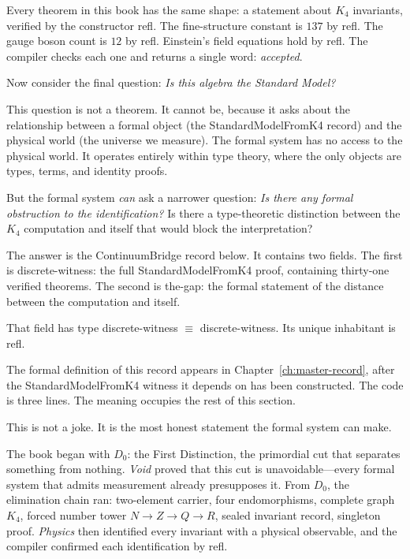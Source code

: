 \documentclass[11pt,a4paper]{book}
\def\mathbb#1{#1}%
\def\texttt#1{#1}%
\begin{document}
Every theorem in this book has the same shape: a statement about $K_4$ invariants, verified by the constructor \texttt{refl}. The fine-structure constant is $137$ by \texttt{refl}. The gauge boson count is $12$ by \texttt{refl}. Einstein's field equations hold by \texttt{refl}. The compiler checks each one and returns a single word: \emph{accepted}.

Now consider the final question: \emph{Is this algebra the Standard Model?}

This question is not a theorem. It cannot be, because it asks about the relationship between a formal object (the \texttt{StandardModelFromK4} record) and the physical world (the universe we measure). The formal system has no access to the physical world. It operates entirely within type theory, where the only objects are types, terms, and identity proofs.

But the formal system \emph{can} ask a narrower question: \emph{Is there any formal obstruction to the identification?} Is there a type-theoretic distinction between the $K_4$ computation and itself that would block the interpretation?

The answer is the \texttt{ContinuumBridge} record below. It contains two fields. The first is \texttt{discrete-witness}: the full \texttt{StandardModelFromK4} proof, containing thirty-one verified theorems. The second is \texttt{the-gap}: the formal statement of the distance between the computation and itself.

That field has type \texttt{discrete-witness $\equiv$ discrete-witness}. Its unique inhabitant is \texttt{refl}.

The formal definition of this record appears in Chapter~\ref{ch:master-record}, after the \texttt{StandardModelFromK4} witness it depends on has been constructed. The code is three lines. The meaning occupies the rest of this section.

This is not a joke. It is the most honest statement the formal system can make.

The book began with $D_0$: the First Distinction, the primordial cut that separates something from nothing. \textit{Void} proved that this cut is unavoidable---every formal system that admits measurement already presupposes it. From $D_0$, the elimination chain ran: two-element carrier, four endomorphisms, complete graph $K_4$, forced number tower $\mathbb{N} \to \mathbb{Z} \to \mathbb{Q} \to \mathbb{R}$, sealed invariant record, singleton proof. \textit{Physics} then identified every invariant with a physical observable, and the compiler confirmed each identification by \texttt{refl}.
\end{document}
